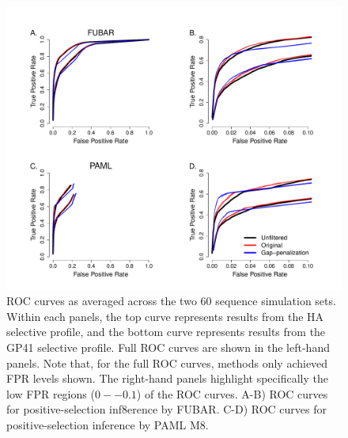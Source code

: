 \documentclass[11pt]{article}
\begin{document}
\bigskip

\begin{figure}[H]
\centerline{\includegraphics[width=6in]{Figures/ROC_prk.pdf}}
\caption{\label{roc} ROC curves as averaged across the two 60 sequence simulation sets. Within each panels, the top curve represents results from the HA selective profile, and the bottom curve represents results from the GP41 selective profile. Full ROC curves are shown in the left-hand panels. Note that, for the full ROC curves, methods only achieved FPR levels shown. The right-hand panels highlight specifically the low FPR regions ($0--0.1$) of the ROC curves. A-B) ROC curves for positive-selection inf8erence by FUBAR. C-D) ROC curves for positive-selection inference by PAML M8.}
\end{figure}
\end{document}
